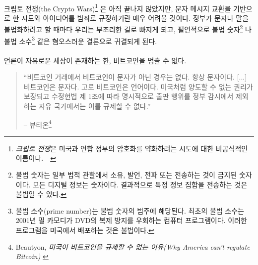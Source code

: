 \paragraph{}
크립토 전쟁(the Crypto Wars)\footnote{\textit{크립토 전쟁}은 미국과 연합 정부의 암호화를 약화하려는 시도에 대한 비공식적인 이름이다.~\cite{eff-cryptowars}~\cite{wiki:cryptowars}} 
은 아직 끝나지 않았지만, 문자 메시지 교환을 기반으로 한 시도와 아이디어를 범죄로 규정하기란 매우 어려울 것이다.
정부가 문자나 말을 불법화하려고 할 때마다 우리는 부조리한 길로 빠지게 되고, 필연적으로 
불법 숫자\footnote{불법 숫자는 일부 법적 관할에서 소유, 발언, 전파 또는 전송하는 것이 금지된 숫자이다. 모든 디지털 정보는 숫자이다.	결과적으로 특정 정보 집합을 전송하는 것은 불법일 수 있다.\cite{wiki:illegal-number}}
나 불법 소수\footnote{불법 소수(prime number)는 불법 숫자의 범주에 해당된다. 최초의 불법 소수는 2001년 필 카모디가 DVD의 복제 방지를 우회하는 컴퓨터 프로그램이다. 이러한 프로그램을 미국에서 배포하는 것은 불법이다.\cite{wiki:illegal-prime}}
 같은 혐오스러운 결론으로 귀결되게 된다.

\paragraph{}
언론이 자유로운 세상이 존재하는 한, 비트코인을 멈출 수 없다.

\begin{quotation}\begin{samepage}
		\enquote{비트코인 거래에서 비트코인이 문자가 아닌 경우는 없다. 항상 문자이다. [...]
			비트코인은 문자다. 고로 비트코인은 언어이다.
			미국처럼 양도할 수 없는 권리가 보장되고 수정헌법 제 1조에 따라 
			명시적으로 출판 행위를 정부 감시에서 제외하는 자유 국가에서는 이를 규제할 수 없다.}
		\begin{flushright} -- 뷰티온\footnote{Beautyon, \textit{미국이 비트코인을 규제할 수 없는 이유(Why America can't regulate Bitcoin)} \cite{america-regulate-bitcoin}}
\end{flushright}\end{samepage}\end{quotation}

